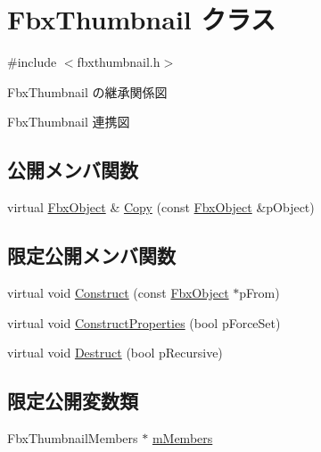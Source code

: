 \hypertarget{class_fbx_thumbnail}{}\section{Fbx\+Thumbnail クラス}
\label{class_fbx_thumbnail}


{\ttfamily \#include $<$fbxthumbnail.\+h$>$}



Fbx\+Thumbnail の継承関係図


Fbx\+Thumbnail 連携図
\subsection*{公開メンバ関数}
\begin{DoxyCompactItemize}
\item 
virtual \hyperlink{class_fbx_object}{Fbx\+Object} \& \hyperlink{class_fbx_thumbnail_a6321469006b5ec3769f618ab2d1444d6}{Copy} (const \hyperlink{class_fbx_object}{Fbx\+Object} \&p\+Object)
\end{DoxyCompactItemize}
\subsection*{限定公開メンバ関数}
\begin{DoxyCompactItemize}
\item 
virtual void \hyperlink{class_fbx_thumbnail_a92347df06d7c26976ed47a9650b691f7}{Construct} (const \hyperlink{class_fbx_object}{Fbx\+Object} $\ast$p\+From)
\item 
virtual void \hyperlink{class_fbx_thumbnail_ac846023b70cdbab67f477109752bfb0d}{Construct\+Properties} (bool p\+Force\+Set)
\item 
virtual void \hyperlink{class_fbx_thumbnail_a3dc89129014f8264fe8e8eb0c6eec711}{Destruct} (bool p\+Recursive)
\end{DoxyCompactItemize}
\subsection*{限定公開変数類}
\begin{DoxyCompactItemize}
\item 
Fbx\+Thumbnail\+Members $\ast$ \hyperlink{class_fbx_thumbnail_afde37b4e171f395489d254b61f42a6cd}{m\+Members}
\end{DoxyCompactItemize}
